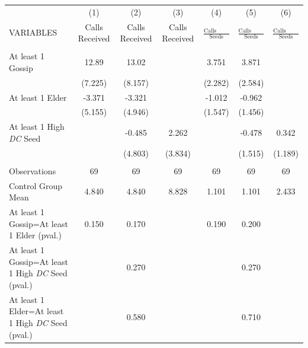 \begin{tabular}{lcccccc} \hline
 & (1) & (2) & (3) & (4) & (5) & (6) \\
VARIABLES & Calls Received & Calls Received & Calls Received & $\frac{\mbox{Calls Received}}{\mbox{Seeds}}$ & $\frac{\mbox{Calls Received}}{\mbox{Seeds}}$ & $\frac{\mbox{Calls Received}}{\mbox{Seeds}}$ \\ \hline
 &  &  &  &  &  &  \\
At least 1 Gossip & 12.89 & 13.02 &  & 3.751 & 3.871 &  \\
 & (7.225) & (8.157) &  & (2.282) & (2.584) &  \\
At least 1 Elder & -3.371 & -3.321 &  & -1.012 & -0.962 &  \\
 & (5.155) & (4.946) &  & (1.547) & (1.456) &  \\
At least 1 High \textit{DC} Seed &  & -0.485 & 2.262 &  & -0.478 & 0.342 \\
 &  & (4.803) & (3.834) &  & (1.515) & (1.189) \\
 &  &  &  &  &  &  \\
Observations & 69 & 69 & 69 & 69 & 69 & 69 \\
Control Group Mean & 4.840 & 4.840 & 8.828 & 1.101 & 1.101 & 2.433 \\
At least 1 Gossip=At least 1 Elder (pval.) & 0.150 & 0.170 &  & 0.190 & 0.200 &  \\
At least 1 Gossip=At least 1 High \textit{DC} Seed (pval.) &  & 0.270 &  &  & 0.270 &  \\
 At least 1 Elder=At least 1 High \textit{DC} Seed (pval.) &  & 0.580 &  &  & 0.710 &  \\ \hline
\end{tabular}
